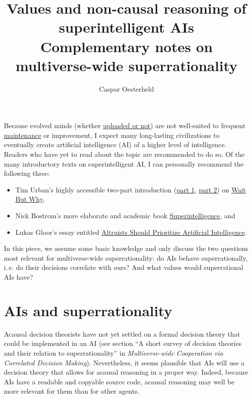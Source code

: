 \documentclass[]{article}
\title{Values and non-causal reasoning of superintelligent AIs \\ \vspace{5mm} \small{Complementary notes on multiverse-wide superrationality}}
\author{Caspar Oesterheld}
\date{}
\begin{document}
\maketitle

Because evolved minds (whether
\href{https://en.wikipedia.org/wiki/Mind_uploading}{uploaded or
not}) are not well-suited to frequent
\href{https://en.wikipedia.org/wiki/Software_maintenance}{maintenance}
or improvement, I expect many long-lasting civilizations to eventually
create artificial intelligence (AI) of a higher level of intelligence.
Readers who have yet to read about the topic are recommended to do so.
Of the many introductory texts on superintelligent AI, I can personally
recommend the following three:

\begin{itemize}
\item
  Tim Urban's highly accessible two-part introduction
  (\href{http://waitbutwhy.com/2015/01/artificial-intelligence-revolution-1.html}{part
  1},
  \href{http://waitbutwhy.com/2015/01/artificial-intelligence-revolution-2.html}{part
  2}) on \href{http://waitbutwhy.com/}{Wait But Why},
\item
  Nick Bostrom's more elaborate and academic book
  \href{https://en.wikipedia.org/wiki/Superintelligence:_Paths,_Dangers,_Strategies}{Superintelligence},
  and
\item
  Lukas Gloor's essay entitled
  \href{https://foundational-research.org/altruists-should-prioritize-artificial-intelligence/}{Altruists
  Should Prioritize Artificial Intelligence}.
\end{itemize}

In this piece, we assume some basic knowledge and only discuss the two
questions most relevant for multiverse-wide superrationality: do AIs
behave superrationally, i.\,e. do their decisions correlate with ours? And
what values would superrational AIs have?

\section{AIs and superrationality}\label{ais-and-superrationality}

Acausal decision theorists have not yet settled on a formal decision
theory that could be implemented in an AI (see section ``A short survey
of decision theories and their relation to superrationality'' in
\emph{Multiverse-wide Cooperation via Correlated Decision Making}).
Nevertheless, it seems plausible that AIs will use a decision
theory that allows for acausal reasoning in a proper way. Indeed,
because AIs have a readable and copyable source code, acausal reasoning
may well be more relevant for them than for other agents.
\end{document}
